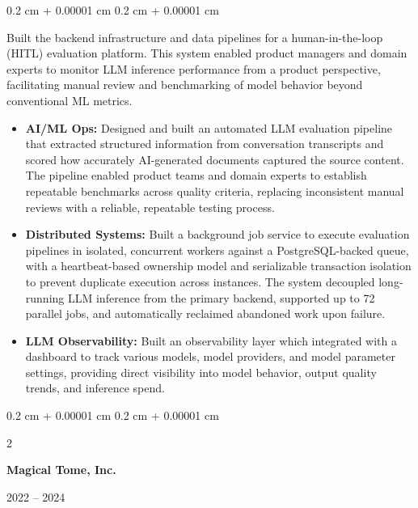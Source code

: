 \documentclass[12pt, letterpaper]{article}
\newenvironment{highlights}{
    \begin{itemize}[
        topsep=0.10 cm,
        parsep=0.10 cm,
        partopsep=0pt,
        itemsep=0pt,
        leftmargin=0.4 cm + 10pt
    ]
}{
    \end{itemize}
} %
\newenvironment{onecolentry}{
    \begin{adjustwidth}{
        0.2 cm + 0.00001 cm
    }{
        0.2 cm + 0.00001 cm
    }
}{
    \end{adjustwidth}
} %
\newenvironment{twocolentry}[2][]{
    \onecolentry
    \def\secondColumn{#2}
    \setcolumnwidth{\fill, 4.5 cm}
    \begin{paracol}{2}
}{
    \switchcolumn \raggedleft \secondColumn
    \end{paracol}
    \endonecolentry
} %
\begin{document}
\vspace{0.10 cm}

\begin{onecolentry}
Built the backend infrastructure and data pipelines for a human-in-the-loop (HITL) evaluation platform. This system enabled product managers and domain experts to monitor LLM inference performance from a product perspective, facilitating manual review and benchmarking of model behavior beyond conventional ML metrics.
	\begin{highlights}
		\item \textbf{AI/ML Ops:} Designed and built an automated LLM evaluation pipeline that extracted structured information from conversation transcripts and scored how accurately AI-generated documents captured the source content. The pipeline enabled product teams and domain experts to establish repeatable benchmarks across quality criteria, replacing inconsistent manual reviews with a reliable, repeatable testing process.
		\item \textbf{Distributed Systems:} Built a background job service to execute evaluation pipelines in isolated, concurrent workers against a PostgreSQL-backed queue, with a heartbeat-based ownership model and serializable transaction isolation to prevent duplicate execution across instances. The system decoupled long-running LLM inference from the primary backend, supported up to 72 parallel jobs, and automatically reclaimed abandoned work upon failure.
		\item \textbf{LLM Observability:} Built an observability layer which integrated with a dashboard to track various models, model providers, and model parameter settings, providing direct visibility into model behavior, output quality trends, and inference spend.
	\end{highlights}
\end{onecolentry}

\vspace{0.2 cm}

\begin{twocolentry}{
		{\color{gray}2022 – 2024}}
	\textbf{Magical Tome, Inc.}
\end{twocolentry}
\end{document}

